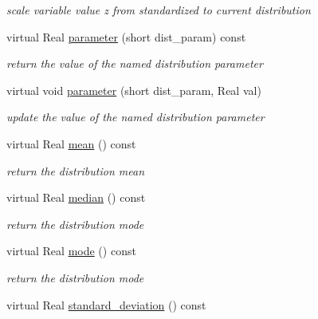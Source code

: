 \begin{DoxyCompactItemize}
\begin{DoxyCompactList}\small\item\em scale variable value z from standardized to current distribution \end{DoxyCompactList}\item 
virtual Real \hyperlink{classPecos_1_1RandomVariable_aa891dab1ae9a225f493e3a0e5032b778}{parameter} (short dist\+\_\+param) const \label{classPecos_1_1RandomVariable_aa891dab1ae9a225f493e3a0e5032b778}

\begin{DoxyCompactList}\small\item\em return the value of the named distribution parameter \end{DoxyCompactList}\item 
virtual void \hyperlink{classPecos_1_1RandomVariable_ae8e123224f588aee676d5d56d5ca900d}{parameter} (short dist\+\_\+param, Real val)\label{classPecos_1_1RandomVariable_ae8e123224f588aee676d5d56d5ca900d}

\begin{DoxyCompactList}\small\item\em update the value of the named distribution parameter \end{DoxyCompactList}\item 
virtual Real \hyperlink{classPecos_1_1RandomVariable_a962ffe5a3593be370d5c883365c060f4}{mean} () const \label{classPecos_1_1RandomVariable_a962ffe5a3593be370d5c883365c060f4}

\begin{DoxyCompactList}\small\item\em return the distribution mean \end{DoxyCompactList}\item 
virtual Real \hyperlink{classPecos_1_1RandomVariable_ae1fff19ce29a79d657043a598523635d}{median} () const \label{classPecos_1_1RandomVariable_ae1fff19ce29a79d657043a598523635d}

\begin{DoxyCompactList}\small\item\em return the distribution mode \end{DoxyCompactList}\item 
virtual Real \hyperlink{classPecos_1_1RandomVariable_a72d3d6926edd929cb3f8e12baa655f70}{mode} () const \label{classPecos_1_1RandomVariable_a72d3d6926edd929cb3f8e12baa655f70}

\begin{DoxyCompactList}\small\item\em return the distribution mode \end{DoxyCompactList}\item 
virtual Real \hyperlink{classPecos_1_1RandomVariable_a6a4ed9624d511f8a4e4f509c82cb0706}{standard\+\_\+deviation} () const \label{classPecos_1_1RandomVariable_a6a4ed9624d511f8a4e4f509c82cb0706}


\end{DoxyCompactItemize}
